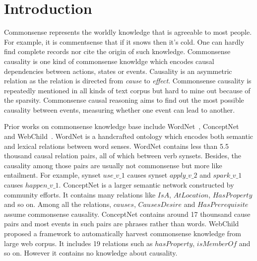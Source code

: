 \section{Introduction}
\label{sec:intro}
Commonsense represents the worldly knowledge that is agreeable to most people.
For example, it is commentsense that if it snows then it's cold. 
One can hardly find complete records nor cite the origin of such knowledge.
Commonsense causality is one kind of commonsense knowldge which 
encodes causal dependencies between actions, states or events.
Causality is an asymmetric relation as the relation is directed
from \emph{cause} to \emph{effect}.
Commonsense causality is repeatedly mentioned in all kinds of text corpus but hard to mine out because of the sparsity. 
Commonsense causal reasoning aims to find out the most possible causality between events, measuring whether one event can lead to another.

Prior works on commonsense knowledge base include WordNet~\cite{miller1995wordnet}, ConceptNet~\cite{havasi2007conceptnet} and 
WebChild~\cite{tandon2017webchild}.
WordNet is a handcrafted ontology which encodes both semantic 
and lexical relations between word senses. WordNet contains less than 
5.5 thousand causal relation pairs, all of which between verb synsets. 
Besides, the causality among those pairs are usually not commonsense 
but more like entailment. For example, synset $use\_v\_1$ causes 
synset $apply\_v\_2$ and $spark\_v\_1$ causes $happen\_v\_1$.
ConceptNet is a larger semantic network constructed by community efforts.
It contains many relations like $IsA$, $AtLocation$, $HasProperty$ and so on. 
Among all the relations, $causes$, $CausesDesire$ and 
$HasPrerequisite$ assume commonsense causality. ConceptNet contains around 
17 thounsand cause pairs and most events in such pairs are phrases 
rather than words.  WebChild proposed a framework to automatically harvest 
commonsense knowledge from large web corpus. It includes 19 
relations such as $hasProperty$, $isMemberOf$ and so on. 
However it contains no knowledge about causality.

